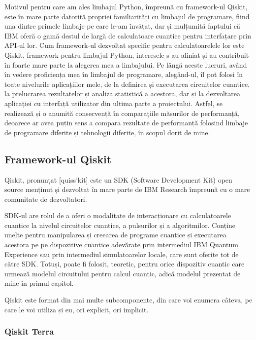Motivul pentru care am ales limbajul Python, împreună cu framework-ul Qiskit, este în mare parte datorită propriei familiarități cu limbajul de programare, fiind una dintre primele limbaje pe care le-am învățat, dar și mulțumită faptului că IBM oferă o gamă destul de largă de calculatoare cuantice pentru interfațare prin API-ul lor. Cum framework-ul dezvoltat specific pentru calculatoarelele lor este Qiskit, framework pentru limbajul Python, interesele s-au aliniat și au contribuit în foarte mare parte la alegerea mea a limbajului. 
Pe lângă aceste lucruri, având în vedere proficiența mea în limbajul de programare, alegând-ul, îl pot folosi în toate nivelurile aplicațiilor mele, de la definirea și executarea circuitelor cuantice, la prelucrarea rezultatelor și analiza statistică a acestora, dar și la dezvoltarea aplicației cu interfață utilizator din ultima parte a proiectului. Astfel, se realizează și o anumită consecvență în comparațiile măsurilor de performanță, deoarece ar avea puțin sens a compara rezultate de performanță folosind limbaje de programare diferite și tehnologii diferite, în scopul dorit de mine.

\subsection{Framework-ul Qiskit}

Qiskit, pronunțat [quiss'kit] este un SDK (Software Development Kit) open source menținut și dezvoltat în mare parte de IBM Research împreună cu o mare comunitate de dezvoltatori. 

SDK-ul are rolul de a oferi o modalitate de interacționare cu calculatoarele cuantice la nivelul circuitelor cuantice, a pulsurilor și a algoritmilor. Conține unelte pentru manipularea și creearea de programe cuantice și executarea acestora pe pe dispozitive cuantice adevărate prin intermediul IBM Quantum Experience sau prin intermediul simulatoarelor locale, care sunt oferite tot de către SDK. Totuși, poate fi folosit, teoretic, pentru orice dispozitiv cuantic care urmează modelul circuitului pentru calcul cuantic, adică modelul prezentat de mine în primul capitol. 

Qiskit este format din mai multe subcomponente, din care voi enumera câteva, pe care le voi utiliza și eu, ori explicit, ori implicit.

\subsubsection{Qiskit Terra}

